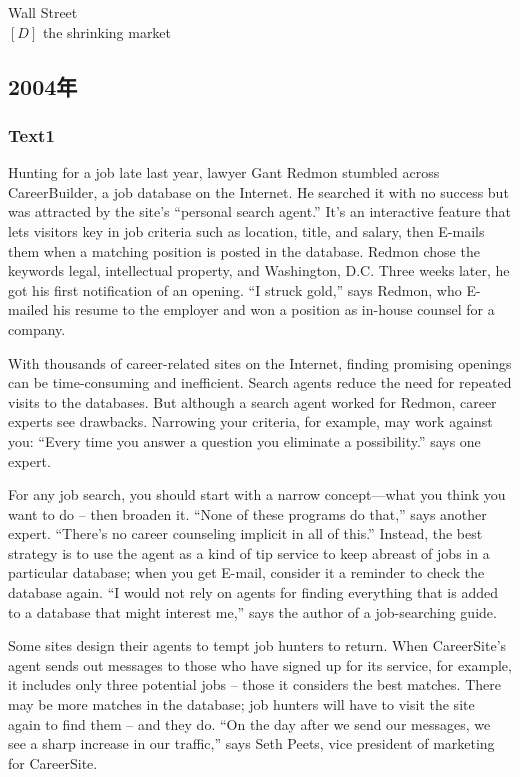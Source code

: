 \documentclass[a4paper]{article}
\begin{document}
Wall Street\\$[D]$ the shrinking market\\\subsection{2004年}
\subsubsection{Text1}

\par
Hunting for a job late last year, lawyer Gant Redmon stumbled across CareerBuilder, a job database on the Internet. He searched it with no success but was attracted by the site’s “personal search agent.” It’s an interactive feature that lets visitors key in job criteria such as location, title, and salary, then E-mails them when a matching position is posted in the database. Redmon chose the keywords legal, intellectual property, and Washington, D.C. Three weeks later, he got his first notification of an opening. “I struck gold,” says Redmon, who E-mailed his resume to the employer and won a position as in-house counsel for a company.

\par
With thousands of career-related sites on the Internet, finding promising openings can be time-consuming and inefficient. Search agents reduce the need for repeated visits to the databases. But although a search agent worked for Redmon, career experts see drawbacks. Narrowing your criteria, for example, may work against you: “Every time you answer a question you eliminate a possibility.” says one expert.

\par
For any job search, you should start with a narrow concept—what you think you want to do -- then broaden it. “None of these programs do that,” says another expert. “There’s no career counseling implicit in all of this.” Instead, the best strategy is to use the agent as a kind of tip service to keep abreast of jobs in a particular database; when you get E-mail, consider it a reminder to check the database again. “I would not rely on agents for finding everything that is added to a database that might interest me,” says the author of a job-searching guide.

\par
Some sites design their agents to tempt job hunters to return. When CareerSite’s agent sends out messages to those who have signed up for its service, for example, it includes only three potential jobs -- those it considers the best matches. There may be more matches in the database; job hunters will have to visit the site again to find them -- and they do. “On the day after we send our messages, we see a sharp increase in our traffic,” says Seth Peets, vice president of marketing for CareerSite.
\end{document}
